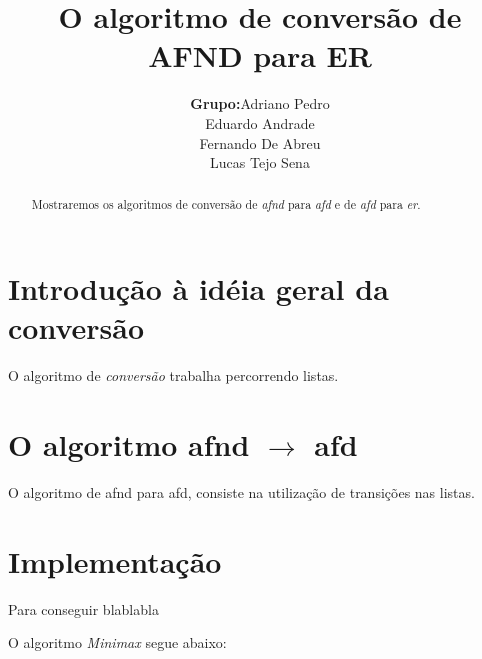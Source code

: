 \documentclass[a4paper,10pt]{article} %
\title{O algoritmo de conversão de AFND para ER}
\author{
    \begin{tabular}{ll}
        \textbf{Grupo:} &
        Adriano Pedro \tabularnewline &
        Eduardo Andrade\tabularnewline &
        Fernando De Abreu\tabularnewline &
        Lucas Tejo Sena\tabularnewline
    \end{tabular}
}
\begin{document}
\maketitle

\begin{abstract}

Mostraremos os algoritmos de conversão de \textit{afnd} para \textit{afd} e de \textit{afd} para \textit{er}.

\end{abstract}


\section{Introdução à idéia geral da conversão}

O algoritmo de \textit{conversão} trabalha percorrendo listas.

\section{O algoritmo afnd $\rightarrow$ afd}

O algoritmo de afnd para afd, consiste na utilização de transições nas listas.

\section{Implementação}

Para conseguir blablabla

O algoritmo \textit{Minimax} segue abaixo:
\end{document}
